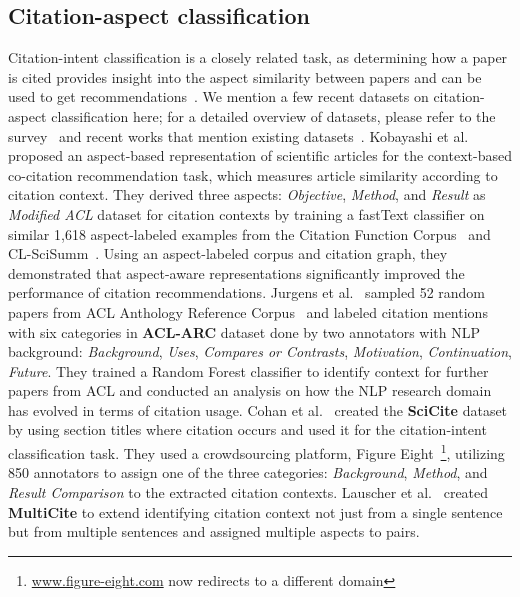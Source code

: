 \documentclass[sigconf,anonymous]{acmart}
\begin{document}
\subsection{Citation-aspect classification}
Citation-intent classification is a closely related task, as determining how a paper is cited provides insight into the aspect similarity between papers and can be used to get recommendations~\cite{2025AspectCodes}.
We mention a few recent datasets on citation-aspect classification here; for a detailed overview of datasets, please refer to the survey~\cite{2025ZhangCiteIntentSurvey} and recent works that mention existing datasets~\cite{2022multicite}.
Kobayashi et al.~\cite{kobayashi2018ACL} proposed an aspect-based representation of scientific articles for the context-based co-citation recommendation task, which measures article similarity according to citation context. 
They derived three aspects: \textit{Objective}, \textit{Method}, and \textit{Result} as \textit{Modified ACL} dataset for citation contexts by training a fastText classifier on similar 1,618 aspect-labeled examples from the Citation Function Corpus~\cite{teufel2006automatic} and CL-SciSumm~\cite{jaidka2019cl}. 
Using an aspect-labeled corpus and citation graph, they demonstrated that aspect-aware representations significantly improved the performance of citation recommendations. 
Jurgens et al.~\cite{Jurgens2018ACLARC} sampled 52 random papers from ACL Anthology Reference Corpus~\cite{bird2008acl} and labeled citation mentions with six categories in \textbf{ACL-ARC} dataset done by two annotators with NLP background: \textit{Background}, \textit{Uses}, \textit{Compares or Contrasts}, \textit{Motivation}, \textit{Continuation}, \textit{Future}. 
They trained a Random Forest classifier to identify context for further papers from ACL and conducted an analysis on how the NLP research domain has evolved in terms of citation usage.
Cohan et al.~\cite{cohan2019structural} created the \textbf{SciCite} dataset by using section titles where citation occurs and used it for the citation-intent classification task. 
They used a crowdsourcing platform, Figure Eight~\footnote{\url{www.figure-eight.com} now redirects to a different domain}, utilizing 850 annotators to assign one of the three categories: \textit{Background}, \textit{Method}, and \textit{Result Comparison} to the extracted citation contexts. 
Lauscher et al.~\cite{2022multicite} created \textbf{MultiCite} to extend identifying citation context not just from a single sentence but from multiple sentences and assigned multiple aspects to pairs.
\end{document}

